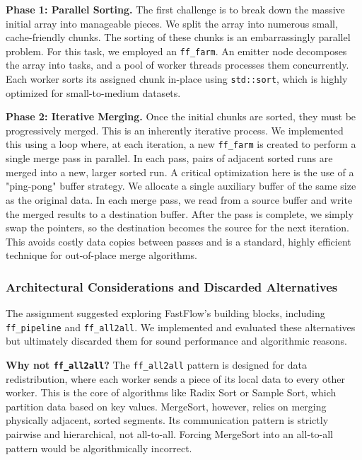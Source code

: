 \documentclass[10pt]{article}
\newcommand{\code}[1]{\texttt{#1}}
\begin{document}
\textbf{Phase 1: Parallel Sorting.} The first challenge is to break down the massive initial array into manageable pieces. We split the array into numerous small, cache-friendly chunks. The sorting of these chunks is an embarrassingly parallel problem. For this task, we employed an \code{ff\_farm}. An emitter node decomposes the array into tasks, and a pool of worker threads processes them concurrently. Each worker sorts its assigned chunk in-place using \code{std::sort}, which is highly optimized for small-to-medium datasets.

\textbf{Phase 2: Iterative Merging.} Once the initial chunks are sorted, they must be progressively merged. This is an inherently iterative process. We implemented this using a loop where, at each iteration, a new \code{ff\_farm} is created to perform a single merge pass in parallel. In each pass, pairs of adjacent sorted runs are merged into a new, larger sorted run. A critical optimization here is the use of a "ping-pong" buffer strategy. We allocate a single auxiliary buffer of the same size as the original data. In each merge pass, we read from a source buffer and write the merged results to a destination buffer. After the pass is complete, we simply swap the pointers, so the destination becomes the source for the next iteration. This avoids costly data copies between passes and is a standard, highly efficient technique for out-of-place merge algorithms.

\subsubsection{Architectural Considerations and Discarded Alternatives}
The assignment suggested exploring FastFlow's building blocks, including \code{ff\_pipeline} and \code{ff\_all2all}. We implemented and evaluated these alternatives but ultimately discarded them for sound performance and algorithmic reasons.

\textbf{Why not \code{ff\_all2all}?} The \code{ff\_all2all} pattern is designed for data redistribution, where each worker sends a piece of its local data to every other worker. This is the core of algorithms like Radix Sort or Sample Sort, which partition data based on key values. MergeSort, however, relies on merging physically adjacent, sorted segments. Its communication pattern is strictly pairwise and hierarchical, not all-to-all. Forcing MergeSort into an all-to-all pattern would be algorithmically incorrect.
\end{document}

